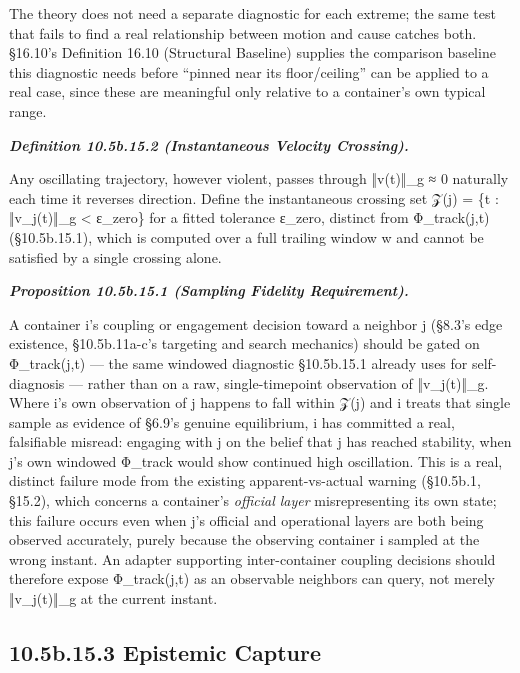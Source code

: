 \documentclass[
]{article}
\begin{document}
The theory does not need a separate diagnostic for each extreme; the
same test that fails to find a real relationship between motion and
cause catches both. §16.10's Definition 16.10 (Structural Baseline)
supplies the comparison baseline this diagnostic needs before ``pinned
near its floor/ceiling'' can be applied to a real case, since these are
meaningful only relative to a container's own typical range.

\emph{\textbf{Definition 10.5b.15.2 (Instantaneous Velocity Crossing).}}

Any oscillating trajectory, however violent, passes through ‖v(t)‖\_g ≈
0 naturally each time it reverses direction. Define the instantaneous
crossing set 𝒵(j) = \{t : ‖v\_j(t)‖\_g \textless{} ε\_zero\} for a
fitted tolerance ε\_zero, distinct from Φ\_track(j,t) (§10.5b.15.1),
which is computed over a full trailing window w and cannot be satisfied
by a single crossing alone.

\emph{\textbf{Proposition 10.5b.15.1 (Sampling Fidelity Requirement).}}

A container i's coupling or engagement decision toward a neighbor j
(§8.3's edge existence, §10.5b.11a-c's targeting and search mechanics)
should be gated on Φ\_track(j,t) --- the same windowed diagnostic
§10.5b.15.1 already uses for self-diagnosis --- rather than on a raw,
single-timepoint observation of ‖v\_j(t)‖\_g. Where i's own observation
of j happens to fall within 𝒵(j) and i treats that single sample as
evidence of §6.9's genuine equilibrium, i has committed a real,
falsifiable misread: engaging with j on the belief that j has reached
stability, when j's own windowed Φ\_track would show continued high
oscillation. This is a real, distinct failure mode from the existing
apparent-vs-actual warning (§10.5b.1, §15.2), which concerns a
container's \emph{official layer} misrepresenting its own state; this
failure occurs even when j's official and operational layers are both
being observed accurately, purely because the observing container i
sampled at the wrong instant. An adapter supporting inter-container
coupling decisions should therefore expose Φ\_track(j,t) as an
observable neighbors can query, not merely ‖v\_j(t)‖\_g at the current
instant.

\hypertarget{b.15.3-epistemic-capture}{%
\subsection{10.5b.15.3 Epistemic
Capture}\label{b.15.3-epistemic-capture}}
\end{document}
